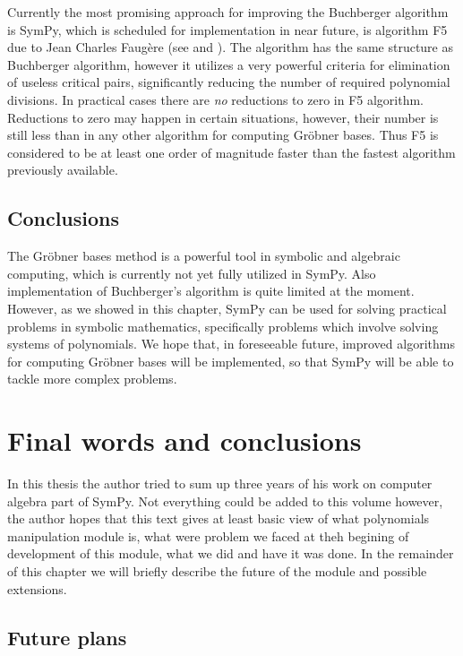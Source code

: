 Currently the most promising approach for improving the Buchberger algorithm is SymPy, which is scheduled
for implementation in near future, is algorithm F5 due to Jean Charles Faugère (see \cite{Faugere2002f5} and
\cite{Stegers2006f5}). The algorithm has the same structure as Buchberger algorithm, however it utilizes a very
powerful criteria for elimination of useless critical pairs, significantly reducing the number of required
polynomial divisions.  In practical cases there are \emph{no} reductions to zero in F5 algorithm. Reductions to
zero may happen in certain situations, however, their number is still less than in any other algorithm for
computing Gröbner bases. Thus F5 is considered to be at least one order of magnitude faster than the
fastest algorithm previously available.


\section{Conclusions}

The Gröbner bases method is a powerful tool in symbolic and algebraic computing, which is currently
not yet fully utilized in SymPy. Also implementation of Buchberger's algorithm is quite limited at
the moment. However, as we showed in this chapter, SymPy can be used for solving practical problems
in symbolic mathematics, specifically problems which involve solving systems of polynomials. We hope
that, in foreseeable future, improved algorithms for computing Gröbner bases will be implemented,
so that SymPy will be able to tackle more complex problems.



\chapter{Final words and conclusions}\label{thesis-conclusions}

In this thesis the author tried to sum up three years of his work on computer algebra part
of SymPy. Not everything could be added to this volume however, the author hopes that
this text gives at least basic view of what polynomials manipulation module is, what were
problem we faced at theh begining of development of this module, what we did and have it
was done. In the remainder of this chapter we will briefly describe the future of the
module and possible extensions.


\section{Future plans}

